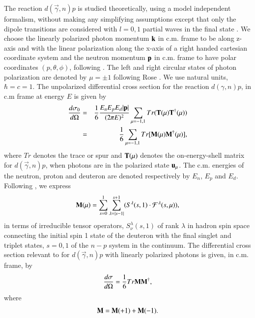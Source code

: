 The reaction $d(\vec \gamma, n)p$ is studied theoretically, using a model independent formalism, without making any simplifying assumptions  except that only the dipole transitions are considered with $l=0,1$  partial waves in the final state \cite{chap34-key50}. We choose the linearly polarized photon momentum ${\bf k}$ in c.m. frame to be along z-axis and with the linear polarization along the x-axis of a right handed cartesian coordinate system and the neutron momentum ${\bf p}$ in c.m. frame to have polar coordinates $(p,\theta,\phi)$, following \cite{chap34-key45}. The left and right circular states of photon polarization are denoted by $\mu =\pm 1$  following Rose \cite{chap34-key51}.  We use natural units, $\hbar = c=1$.  The unpolarized differential cross section for the reaction $d(\gamma, n)p$, in c.m frame at energy $E$ is given by 
\makeatletter
{}
\makeatother
\begin{eqnarray}
{d\sigma_0 \over d\Omega}&=&{1 \over 6} { E_n E_p E_d |{\bf p}| \over (2\pi E)^2 } \sum_{\mu=-1,1} Tr({\bf T}(\mu) {\bf T}^\dagger(\mu)) \nonumber \\ 
 &=& {1 \over 6} \sum_{\mu=-1,1} Tr[{\bf M}(\mu) {\bf M}^\dagger(\mu)], \label{chap34-eq1}
\end{eqnarray}
where $Tr$ denotes the trace or spur and ${\bf T}(\mu)$ denotes the on-energy-shell matrix for $d(\vec \gamma, n)p$,  when photons are in the polarized state ${\bf u}_\mu$. The c.m. energies of the neutron, proton and deuteron are denoted respectively by $E_n$, $E_p$ and  $E_d$.  Following \cite{chap34-key52}, we express 
\begin{equation}
{\bf M}(\mu) = \sum_{s=0}^1 \sum_{\lambda = |s-1|}^{s+1} (S^\lambda(s,1) \cdot {\mathcal F}^\lambda(s,\mu)), \label{chap34-eq2}
\end{equation}
in terms of irreducible tensor operators, $S^\lambda_{\nu}(s,1)$ of rank $\lambda$ in hadron spin space \cite{chap34-key53} connecting the initial spin 1 state of the deuteron with the final singlet and triplet states, $s=0,1$ of  the $n-p$ system in the continuum.  The differential cross section relevant to \cite{chap34-key45,chap34-key46} for $d(\vec \gamma, n)p$ with linearly  polarized photons is given, in c.m. frame, by  
\begin{eqnarray}
{d\sigma \over d\Omega} ={1 \over 6} Tr {\bf M M^\dagger}, \label{chap34-eq3}
\end{eqnarray}
where
\begin{equation} 
{\bf M= M}(+1)+{\bf M}(-1).\label{chap34-eq4}
\end{equation}
